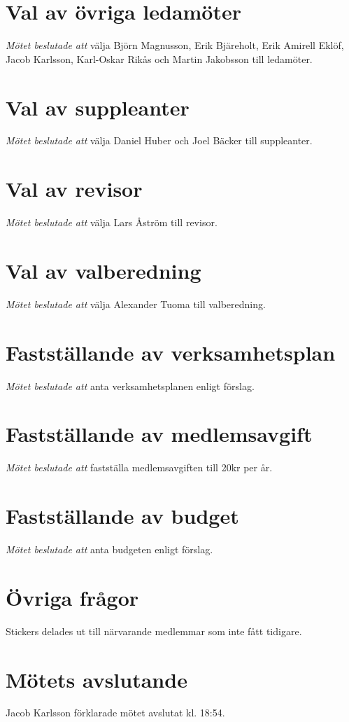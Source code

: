 \documentclass{article}
\begin{document}
\section{Val av övriga ledamöter}
\emph{Mötet beslutade att} välja Björn Magnusson, Erik Bjäreholt, Erik Amirell Eklöf, Jacob Karlsson, Karl-Oskar Rikås och Martin Jakobsson till ledamöter.

\section{Val av suppleanter}
\emph{Mötet beslutade att} välja Daniel Huber och Joel Bäcker till suppleanter.

\section{Val av revisor}
\emph{Mötet beslutade att} välja Lars Åström till revisor.

\section{Val av valberedning}
\emph{Mötet beslutade att} välja Alexander Tuoma till valberedning.

\section{Fastställande av verksamhetsplan}
\emph{Mötet beslutade att} anta verksamhetsplanen enligt förslag.

\section{Fastställande av medlemsavgift}
\emph{Mötet beslutade att} fastställa medlemsavgiften till 20kr per år.

\section{Fastställande av budget}
\emph{Mötet beslutade att} anta budgeten enligt förslag.

\section{Övriga frågor}
Stickers delades ut till närvarande medlemmar som inte fått tidigare.

\section{Mötets avslutande}
Jacob Karlsson förklarade mötet avslutat kl. 18:54.\\[2ex]
\end{document}
